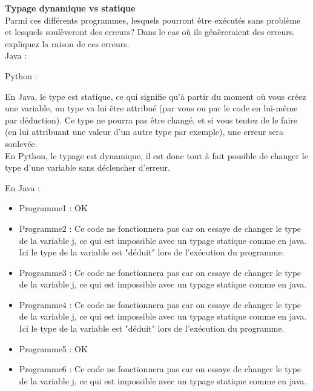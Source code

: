\begin{Exercice}[15 minutes]  \textbf{Typage dynamique vs statique}\\
    
    Parmi ces différents programmes, lesquels pourront être exécutés sans problème et lesquels soulèveront des erreurs? Dans le cas où ils génèreraient des erreurs, expliquez la raison de ces erreurs.\\
    
    Java :
    
     
    
    Python :
    
     
    

    \begin{conseil}
    
        En Java, le type est statique, ce qui signifie qu'à partir du moment où vous créez une variable, un type va lui être attribué (par vous ou par le code en lui-même par déduction). Ce type ne pourra pas être changé, et si vous tentez de le faire (en lui attribuant une valeur d'un autre type par exemple), une erreur sera soulevée. \\

En Python, le typage est dynamique, il est donc tout à fait possible de changer le type d'une variable sans déclencher d'erreur. \\

    \end{conseil}
    \begin{solution}
        En Java : \\
        
        \begin{itemize}
        	\item Programme1 : OK
        	\item Programme2 : Ce code ne fonctionnera pas car on essaye de changer le type de la variable j, ce qui est impossible avec un typage statique comme en java. Ici le type de la variable est "déduit" lors de l'exécution du programme.
        	\item Programme3 : Ce code ne fonctionnera pas car on essaye de changer le type de la variable j, ce qui est impossible avec un typage statique comme en java.
        	\item Programme4 : Ce code ne fonctionnera pas car on essaye de changer le type de la variable j, ce qui est impossible avec un typage statique comme en java. Ici le type de la variable est "déduit" lors de l'exécution du programme.
        	\item Programme5 : OK
        	\item Programme6 : Ce code ne fonctionnera pas car on essaye de changer le type de la variable j, ce qui est impossible avec un typage statique comme en java. \\
        \end{itemize}
        

\end{solution}
\end{Exercice}

